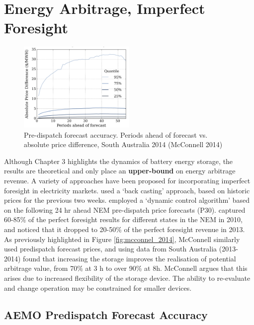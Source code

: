 \chapter{ Energy Arbitrage, Imperfect Foresight }
\begin{figure}
    \begin{center}
    \centering
\includegraphics[width=0.5\textwidth]{Pictures/Chapter3/mcconnel_imperfect_forecast.png}
    \end{center}
    \caption{Pre-dispatch forecast accuracy. Periods ahead of forecast vs. absolute price difference, South Australia 2014 (McConnell 2014)}
    \label{fig:mcconnell_predispatch_accuracy}
\end{figure}
Although Chapter 3 highlights the dynamics of battery energy storage, the results are theoretical and only place an \textbf{upper-bound} on energy arbitrage revenue. A  variety of approaches have been proposed for incorporating
imperfect foresight in electricity markets. \parencite{Sioshansi} used a ‘back casting’ approach, based on historic prices for the previous two weeks. \parencite{Wang} employed a `dynamic control algorithm' based on the following 24 hr ahead NEM pre-dispatch price forecasts (P30). \parencite{Wang} captured 60-85\% of the perfect foresight results for different states in the NEM in 2010, and noticed that it dropped to 20-50\% of the perfect foresight revenue in 2013. As previously highlighted in Figure \ref{fig:mcconnel_2014}, McConnell similarly used predispatch forecast prices, and using data from South Australia (2013-2014) found that increasing the storage improves the realisation of potential arbitrage value, from 70\% at 3 h to over 90\% at 8h. McConnell argues that this arises due to increased flexibility of the storage device. The ability to re-evaluate and change operation may be constrained for smaller devices.
\section{ AEMO Predispatch Forecast Accuracy }
